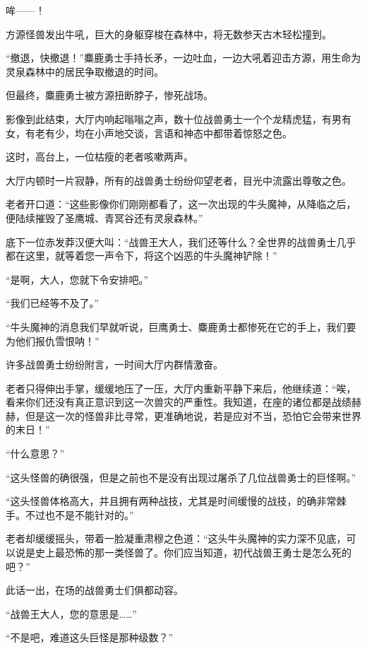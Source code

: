 
\begin{this_body}

哞——！

方源怪兽发出牛吼，巨大的身躯穿梭在森林中，将无数参天古木轻松撞到。

“撤退，快撤退！”麋鹿勇士手持长矛，一边吐血，一边大吼着迎击方源，用生命为灵泉森林中的居民争取撤退的时间。

但最终，麋鹿勇士被方源扭断脖子，惨死战场。

影像到此结束，大厅内响起嗡嗡之声，数十位战兽勇士一个个龙精虎猛，有男有女，有老有少，均在小声地交谈，言语和神态中都带着惊怒之色。

这时，高台上，一位枯瘦的老者咳嗽两声。

大厅内顿时一片寂静，所有的战兽勇士纷纷仰望老者，目光中流露出尊敬之色。

老者开口道：“这些影像你们刚刚都看了，这一次出现的牛头魔神，从降临之后，便陆续摧毁了圣鹰城、青冥谷还有灵泉森林。”

底下一位赤发莽汉便大叫：“战兽王大人，我们还等什么？全世界的战兽勇士几乎都在这里，就等着您一声令下，将这个凶恶的牛头魔神铲除！”

“是啊，大人，您就下令安排吧。”

“我们已经等不及了。”

“牛头魔神的消息我们早就听说，巨鹰勇士、麋鹿勇士都惨死在它的手上，我们要为他们报仇雪恨呐！”

许多战兽勇士纷纷附言，一时间大厅内群情激奋。

老者只得伸出手掌，缓缓地压了一压，大厅内重新平静下来后，他继续道：“唉，看来你们还没有真正意识到这一次兽灾的严重性。我知道，在座的诸位都是战绩赫赫，但是这一次的怪兽非比寻常，更准确地说，若是应对不当，恐怕它会带来世界的末日！”

“什么意思？”

“这头怪兽的确很强，但是之前也不是没有出现过屠杀了几位战兽勇士的巨怪啊。”

“这头怪兽体格高大，并且拥有两种战技，尤其是时间缓慢的战技，的确非常棘手。不过也不是不能针对的。”

老者却缓缓摇头，带着一脸凝重肃穆之色道：“这头牛头魔神的实力深不见底，可以说是史上最恐怖的那一类怪兽了。你们应当知道，初代战兽王勇士是怎么死的吧？”

此话一出，在场的战兽勇士们俱都动容。

“战兽王大人，您的意思是……”

“不是吧，难道这头巨怪是那种级数？”


\end{this_body}
